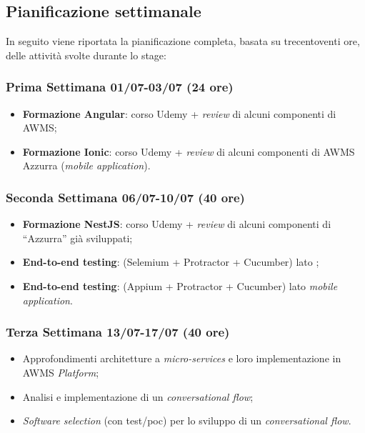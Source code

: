 \subsection{Pianificazione settimanale}
In seguito viene riportata la pianificazione completa, basata su trecentoventi ore, delle attività svolte durante lo stage:
\begin{trivlist}
	\item \subsubsection{Prima Settimana 01/07-03/07 (24 ore)}   
	\begin{itemize}
		\item \textbf{Formazione Angular}: corso Udemy + \emph{review} di alcuni componenti di \gls{AWMS};
		\item \textbf{Formazione Ionic}: corso Udemy + \emph{review} di alcuni componenti di \gls{AWMS} Azzurra (\emph{mobile application}).
	\end{itemize}  

\item \subsubsection{Seconda Settimana 06/07-10/07 (40 ore)}
\begin{itemize}
	\item \textbf{Formazione NestJS}: corso Udemy + \emph{review} di alcuni componenti di “Azzurra” già sviluppati;
	\item \textbf{End-to-end testing}: (Selemium + Protractor + Cucumber) lato ;
	\item \textbf{End-to-end testing}: (Appium + Protractor + Cucumber) lato \emph{mobile} \emph{application}.
\end{itemize}

\item \subsubsection{Terza Settimana 13/07-17/07 (40 ore)}
\begin{itemize}
	\item Approfondimenti architetture a \emph{micro-services} e loro implementazione in \gls{AWMS} \emph{Platform};
	\item Analisi e implementazione di un \emph{conversational flow};
	\item \emph{Software selection} (con test/poc) per lo sviluppo di un \emph{conversational flow}.
\end{itemize}	


\end{trivlist}
